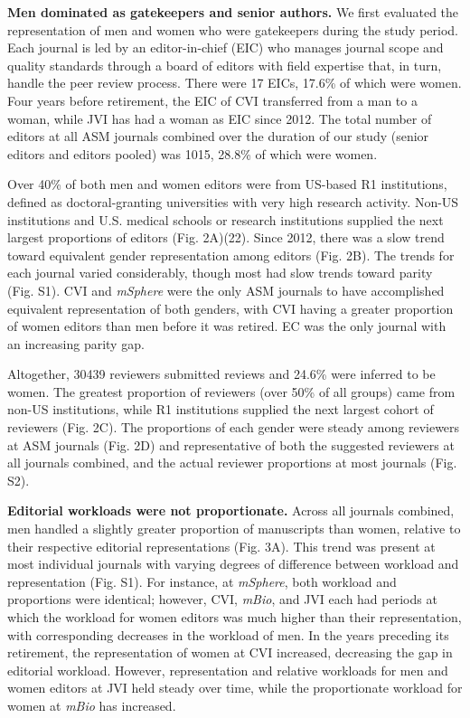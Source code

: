 \documentclass[11pt,]{article}
\begin{document}
\textbf{Men dominated as gatekeepers and senior authors.} We first
evaluated the representation of men and women who were gatekeepers
during the study period. Each journal is led by an editor-in-chief (EIC)
who manages journal scope and quality standards through a board of
editors with field expertise that, in turn, handle the peer review
process. There were 17 EICs, 17.6\% of which were women. Four years
before retirement, the EIC of CVI transferred from a man to a woman,
while JVI has had a woman as EIC since 2012. The total number of editors
at all ASM journals combined over the duration of our study (senior
editors and editors pooled) was 1015, 28.8\% of which were women.

Over 40\% of both men and women editors were from US-based R1
institutions, defined as doctoral-granting universities with very high
research activity. Non-US institutions and U.S. medical schools or
research institutions supplied the next largest proportions of editors
(Fig. 2A)(22). Since 2012, there was a slow trend toward equivalent
gender representation among editors (Fig. 2B). The trends for each
journal varied considerably, though most had slow trends toward parity
(Fig. S1). CVI and \emph{mSphere} were the only ASM journals to have
accomplished equivalent representation of both genders, with CVI having
a greater proportion of women editors than men before it was retired. EC
was the only journal with an increasing parity gap.

Altogether, 30439 reviewers submitted reviews and 24.6\% were inferred
to be women. The greatest proportion of reviewers (over 50\% of all
groups) came from non-US institutions, while R1 institutions supplied
the next largest cohort of reviewers (Fig. 2C). The proportions of each
gender were steady among reviewers at ASM journals (Fig. 2D) and
representative of both the suggested reviewers at all journals combined,
and the actual reviewer proportions at most journals (Fig. S2).

\textbf{Editorial workloads were not proportionate.} Across all journals
combined, men handled a slightly greater proportion of manuscripts than
women, relative to their respective editorial representations (Fig. 3A).
This trend was present at most individual journals with varying degrees
of difference between workload and representation (Fig. S1). For
instance, at \emph{mSphere}, both workload and proportions were
identical; however, CVI, \emph{mBio}, and JVI each had periods at which
the workload for women editors was much higher than their
representation, with corresponding decreases in the workload of men. In
the years preceding its retirement, the representation of women at CVI
increased, decreasing the gap in editorial workload. However,
representation and relative workloads for men and women editors at JVI
held steady over time, while the proportionate workload for women at
\emph{mBio} has increased.
\end{document}
